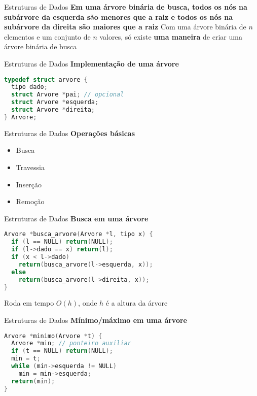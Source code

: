 \documentclass[10pt]{beamer}
\begin{document}
\begin{frame}{Estruturas de Dados}
  \huge
  \textbf{Em uma árvore binária \alert{de busca}, todos os nós na \alert{subárvore da esquerda são menores} que a raiz e todos os nós na \alert{subárvore da direita são maiores} que a raiz}
  \vfill
  \large
  Com uma árvore binária de \textbf{$n$} elementos e um conjunto de \textbf{$n$} valores, só existe \textbf{uma maneira} de criar uma árvore binária de busca
\end{frame}

\begin{frame}[fragile]{Estruturas de Dados}
  \huge
  \textbf{Implementação de uma árvore}
  \vfill
  \large
  \begin{lstlisting}[language=C]
typedef struct arvore {
  tipo dado;
  struct Arvore *pai; // opcional
  struct Arvore *esquerda;
  struct Arvore *direita;
} Arvore;
  \end{lstlisting}
\end{frame}

\begin{frame}{Estruturas de Dados}
  \huge
  \textbf{Operações básicas}
  \vfill
  \LARGE
  \begin{itemize}
    \item Busca
    \item Travessia
    \item Inserção
    \item Remoção
  \end{itemize}
\end{frame}

\begin{frame}[fragile]{Estruturas de Dados}
  \huge
  \textbf{Busca em uma árvore}
  \vfill
  \large
  \begin{lstlisting}[language=C]
Arvore *busca_arvore(Arvore *l, tipo x) {
  if (l == NULL) return(NULL);
  if (l->dado == x) return(l);
  if (x < l->dado)
    return(busca_arvore(l->esquerda, x));
  else
    return(busca_arvore(l->direita, x));
}
  \end{lstlisting}
  \vfill
  \large
  Roda em tempo \textbf{$O(h)$}, onde \textbf{$h$} é a altura da árvore
\end{frame}

\begin{frame}[fragile]{Estruturas de Dados}
  \huge
  \textbf{Mínimo/máximo em uma árvore}
  \vfill
  \large
  \begin{lstlisting}[language=C]
Arvore *minimo(Arvore *t) {
  Arvore *min; // ponteiro auxiliar
  if (t == NULL) return(NULL);
  min = t;
  while (min->esquerda != NULL)
    min = min->esquerda;
  return(min);
}
  \end{lstlisting}
\end{frame}
\end{document}
